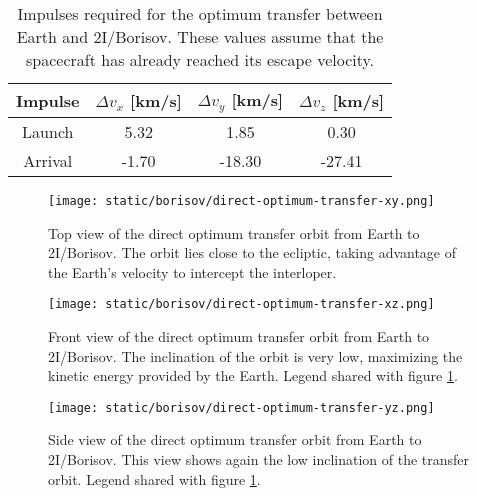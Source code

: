 \vspace{1cm}
\begin{table}[H]
  \centering
  \begin{tabular}{|c|c|c|c|}
    \hline
    Impulse & $\Delta v_x$ [km/s] & $\Delta v_y$ [km/s] & $\Delta v_z$ [km/s] \\
    \hline
    Launch  & 5.32                & 1.85                & 0.30                \\
    \hline
    Arrival & -1.70               & -18.30              & -27.41              \\
    \hline
  \end{tabular}
  \caption[Impulses required for the optimum transfer between Earth and
    2I/Borisov.]{Impulses required for the optimum transfer between Earth
    and 2I/Borisov. These values assume that the spacecraft has already
    reached its escape velocity.}
  \label{tab:borisov-direct-transfer-impulses}
\end{table}

\begin{figure}[H]
  \centering
  \texttt{[image: static/borisov/direct-optimum-transfer-xy.png]}
  \caption[Top view of the direct optimum transfer orbit from Earth to
    2I/Borisov]{
    Top view of the direct optimum transfer orbit from Earth to 2I/Borisov.
    The orbit lies close to the ecliptic, taking advantage of the Earth's
    velocity to intercept the interloper.
  }
  \label{fig:optimum_borisov_orbit_xy}
\end{figure}

\begin{figure}[H]
  \centering
  \texttt{[image: static/borisov/direct-optimum-transfer-xz.png]}
  \caption[Front view of the direct optimum transfer orbit from Earth to 2I/Borisov]{
    Front view of the direct optimum transfer orbit from Earth to 2I/Borisov.
    The inclination of the orbit is very low, maximizing the kinetic energy
    provided by the Earth. Legend shared with figure \ref{fig:optimum_borisov_orbit_xy}.
  }
  \label{fig:optimum_borisov_orbit_yz}
\end{figure}

\begin{figure}[H]
  \centering
  \texttt{[image: static/borisov/direct-optimum-transfer-yz.png]}
  \caption[Side view of the direct optimum transfer orbit from Earth to 2I/Borisov]{
    Side view of the direct optimum transfer orbit from Earth to 2I/Borisov.
    This view shows again the low inclination of the transfer orbit. Legend
    shared with figure \ref{fig:optimum_borisov_orbit_xy}.
  }
  \label{fig:optimum_borisov_orbit_xz}
\end{figure}
